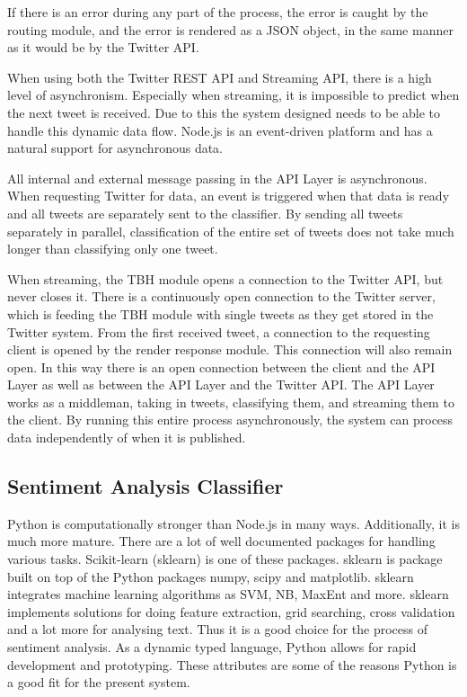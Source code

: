 If there is an error during any part of the process, the error is caught by the routing module, and the error is rendered as a JSON object, in the same manner as it would be by the Twitter API. 

When using both the Twitter REST API and Streaming API, there is a high level of asynchronism. Especially when streaming, it is impossible to predict when the next tweet is received. Due to this the system designed needs to be able to handle this dynamic data flow. Node.js is an event-driven platform and has a natural support for asynchronous data. 

All internal and external message passing in the API Layer is asynchronous. When requesting Twitter for data, an event is triggered when that data is ready and all tweets are separately sent to the classifier. By sending all tweets separately in parallel, classification of the entire set of tweets does not take much longer than classifying only one tweet. 

When streaming, the TBH module opens a connection to the Twitter API, but never closes it. There is a continuously open connection to the Twitter server, which is feeding the TBH module with single tweets as they get stored in the Twitter system. From the first received tweet, a connection to the requesting client is opened by the render response module. This connection will also remain open. In this way there is an open connection between the client and the API Layer as well as between the API Layer and the Twitter API. The API Layer works as a middleman, taking in tweets, classifying them, and streaming them to the client. By running this entire process asynchronously, the system can process data independently of when it is published.


\subsection{Sentiment Analysis Classifier}
\label{sec:classifier_arch}

Python is computationally stronger than Node.js in many ways. Additionally, it is much more mature. There are a lot of well documented packages for handling various tasks. Scikit-learn (sklearn) is one of these packages. sklearn is package built on top of the Python packages numpy, scipy and matplotlib. sklearn integrates machine learning algorithms as SVM, NB, MaxEnt and more. sklearn implements solutions for doing feature extraction, grid searching, cross validation and a lot more for analysing text. Thus it is a good choice for the process of sentiment analysis. As a dynamic typed language, Python allows for rapid development and prototyping. These attributes are some of the reasons Python is a good fit for the present system. 

